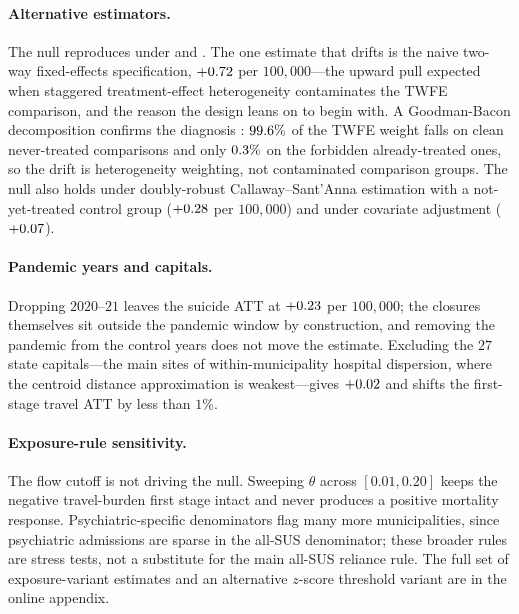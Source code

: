 \paragraph{Alternative estimators.} The null reproduces under
\citet{cs2021} and \citet{borusyak2024}. The one estimate that drifts is
the naive two-way fixed-effects specification, $+0.72$ per
$100{,}000$---the upward pull expected when staggered treatment-effect
heterogeneity contaminates the TWFE comparison, and the reason the design
leans on \citet{sunAbraham2021} to begin with. A Goodman-Bacon
decomposition confirms the diagnosis \citep{goodmanBacon2021}:
$99.6\%$ of the TWFE weight falls on clean never-treated
comparisons and only $0.3\%$ on the forbidden
already-treated ones, so the drift is heterogeneity weighting, not
contaminated comparison groups. The null also holds under doubly-robust
Callaway--Sant'Anna estimation with a not-yet-treated control group
($+0.28$ per $100{,}000$) and under covariate adjustment
($+0.07$).

\paragraph{Pandemic years and capitals.} Dropping $2020$--$21$ leaves the
suicide ATT at $+0.23$ per $100{,}000$; the closures
themselves sit outside the pandemic window by construction, and removing
the pandemic from the control years does not move the estimate. Excluding
the $27$ state capitals---the main sites of within-municipality hospital
dispersion, where the centroid distance approximation is weakest---gives
$+0.02$ and shifts the first-stage travel ATT by less than
$1\%$.

\paragraph{Exposure-rule sensitivity.} The flow cutoff is not driving the
null. Sweeping $\theta$ across $[0.01, 0.20]$ keeps the negative
travel-burden first stage intact and never produces a positive mortality
response. Psychiatric-specific denominators flag many more municipalities,
since psychiatric admissions are sparse in the all-SUS denominator; these
broader rules are stress tests, not a substitute for the main
all-SUS reliance rule. The full set of exposure-variant estimates and an
alternative $z$-score threshold variant are in the online appendix.

